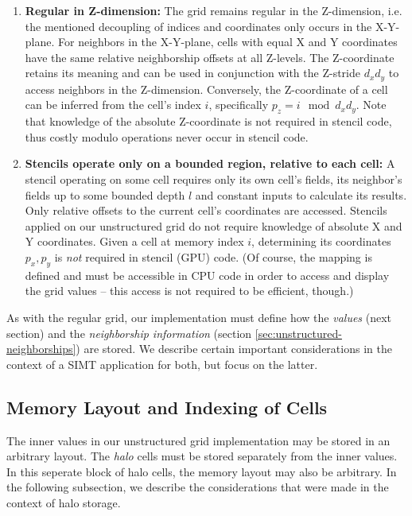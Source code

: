\begin{enumerate}
	\item \textbf{Regular in Z-dimension:} The grid remains regular in the Z-dimension, i.e. the mentioned decoupling of indices and coordinates only occurs in the X-Y-plane. For neighbors in the X-Y-plane, cells with equal X and Y coordinates have the same relative neighborship offsets at all Z-levels. The Z-coordinate retains its meaning and can be used in conjunction with the Z-stride $d_xd_y$ to access neighbors in the Z-dimension. Conversely, the Z-coordinate of a cell can be inferred from the cell's index $i$, specifically $p_z = i \mod d_xd_y$. Note that knowledge of the absolute Z-coordinate is not required in stencil code, thus costly modulo operations never occur in stencil code.
	\item \textbf{Stencils operate only on a bounded region, relative to each cell:} A stencil operating on some cell requires only its own cell's fields, its neighbor's fields up to some bounded depth $l$ and constant inputs to calculate its results. Only relative offsets to the current cell's coordinates are accessed. Stencils applied on our unstructured grid do not require knowledge of absolute X and Y coordinates. Given a cell at memory index $i$, determining its coordinates $p_x, p_y$ is \emph{not} required in stencil (GPU) code. (Of course, the mapping is defined and must be accessible in CPU code in order to access and display the grid values -- this access is not required to be efficient, though.) 
\end{enumerate}

As with the regular grid, our implementation must define how the \emph{values} (next section) and the \emph{neighborship information} (section \ref{sec:unstructured-neighborships}) are stored. We describe certain important considerations in the context of a SIMT application for both, but focus on the latter.

\subsection{Memory Layout and Indexing of Cells} 
\label{sec:unstructured-indexing}

The inner values in our unstructured grid implementation may be stored in an arbitrary layout. The \emph{halo} cells must be stored separately from the inner values. In this seperate block of halo cells, the memory layout may also be arbitrary. In the following subsection, we describe the considerations that were made in the context of halo storage.

